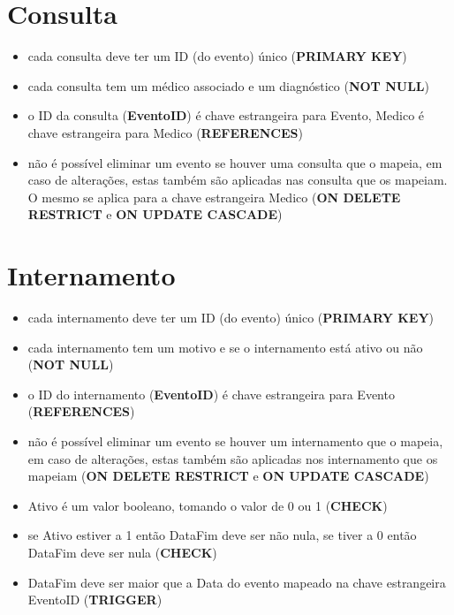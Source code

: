 \documentclass[article, a4paper, 12pt, oneside]{memoir}
\begin{document}
\section*{Consulta}
\begin{itemize}
	\item cada consulta deve ter um ID (do evento) único (\textbf{PRIMARY KEY})
	\item cada consulta tem um médico associado e um diagnóstico (\textbf{NOT NULL})
	\item o ID da consulta (\textbf{EventoID}) é chave estrangeira para Evento, Medico é chave estrangeira para Medico (\textbf{REFERENCES})
	\item não é possível eliminar um evento se houver uma consulta que o mapeia, em caso de alterações, estas também são aplicadas nas consulta que os mapeiam. O mesmo se aplica para a chave estrangeira Medico (\textbf{ON DELETE RESTRICT} e \textbf{ON UPDATE CASCADE})
\end{itemize}

\section*{Internamento}
\begin{itemize}
	\item cada internamento deve ter um ID (do evento) único (\textbf{PRIMARY KEY})
	\item cada internamento tem um motivo e se o internamento está ativo ou não (\textbf{NOT NULL})
	\item o ID do internamento (\textbf{EventoID}) é chave estrangeira para Evento (\textbf{REFERENCES})
	\item não é possível eliminar um evento se houver um internamento que o mapeia, em caso de alterações, estas também são aplicadas nos internamento que os mapeiam (\textbf{ON DELETE RESTRICT} e \textbf{ON UPDATE CASCADE})
	\item Ativo é um valor booleano, tomando o valor de 0 ou 1 (\textbf{CHECK})
	\item se Ativo estiver a 1 então DataFim deve ser não nula, se tiver a 0 então DataFim deve ser nula (\textbf{CHECK})
	\item DataFim deve ser maior que a Data do evento mapeado na chave estrangeira EventoID (\textbf{TRIGGER})
\end{itemize}
\end{document}
